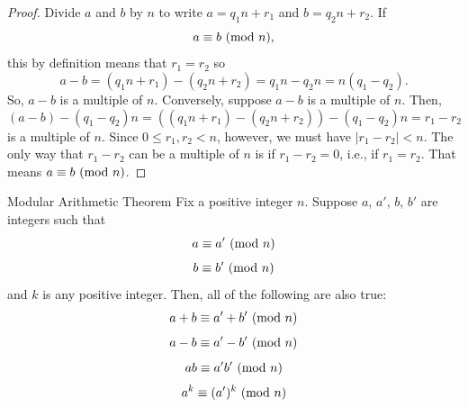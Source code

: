 \documentclass[letterpaper]{article}
\newcommand{\0}{\mathbf{0}}
\begin{document}
\begin{proof}
    Divide $a$ and $b$ by $n$ to write $a = q_1 n + r_1$ and $b = q_2 n + r_2$. If \[a \equiv b \ (\mathrm{mod}\ n),\] this by definition means that $r_1 = r_2$ so 
    \[a - b = (q_1 n + r_1) - (q_2 n + r_2) = q_1 n - q_2 n = n(q_1 - q_2).\]
    So, $a - b$ is a multiple of $n$. Conversely, suppose $a - b$ is a multiple of $n$. Then, 
    \[(a - b) - (q_1 - q_2)n = ((q_1 n + r_1) - (q_2 n + r_2)) - (q_1 - q_2)n = r_1 - r_2\]
    is a multiple of $n$. Since $0 \leq r_1, r_2 < n$, however, we must have $|r_1 - r_2| < n$. The only way that $r_1 - r_2$ can be a multiple of $n$ is if $r_1 - r_2 = 0$, i.e., if $r_1 = r_2$. That means $a \equiv b \ (\mathrm{mod}\ n)$. 
\end{proof}

\begin{theorem}{Modular Arithmetic Theorem}{}
    Fix a positive integer $n$. Suppose $a$, $a'$, $b$, $b'$ are integers such that 
    \[a \equiv a' \ (\mathrm{mod}\ n)\]
    \[b \equiv b' \ (\mathrm{mod}\ n)\]
    and $k$ is any positive integer. Then, all of the following are also true: 
    \[a + b \equiv a' + b' \ (\mathrm{mod}\ n)\]
    \[a - b \equiv a' - b' \ (\mathrm{mod}\ n)\]
    \[ab \equiv a'b' \ (\mathrm{mod}\ n)\]
    \[a^k \equiv (a')^k \ (\mathrm{mod}\ n)\]
\end{theorem}
\end{document}
